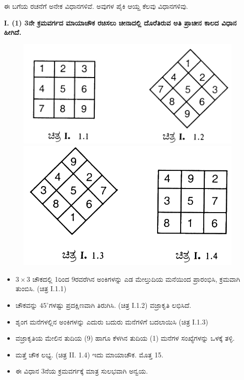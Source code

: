 ಈ ಬಗೆಯ ರಚನೆಗೆ ಅನೇಕ ವಿಧಾನಗಳಿವೆ. ಅವುಗಳ ಪೈಕಿ ಆಯ್ದ ಕೆಲವು ವಿಧಾನಗಳಿವು.

\noindent\textbf{I. (1) 3ನೇ ಕ್ರಮವರ್ಗದ ಮಾಯಾಚೌಕ ರಚಿಸಲು ಚೀನಾದಲ್ಲಿ ದೊರೆತಿರುವ ಅತಿ ಪ್ರಾಚೀನ ಕಾಲದ ವಿಧಾನ ಹೀಗಿದೆ.}

\begin{figure}[H]
\includegraphics{src/figures/chap3/fig3-1.jpg}\\
\includegraphics{src/figures/chap3/fig3-2.jpg}
\end{figure}

\begin{itemize}
	\item $3 \times 3$ ಚೌಕದಲ್ಲಿ 1ರಿಂದ 9ರವರೆಗಿನ ಅಂಕಿಗಳನ್ನು ಎಡ ಮೇಲ್ತುದಿಯ ಮನೆಯಿಂದ ಪ್ರಾರಂಭಿಸಿ, ಕ್ರಮವಾಗಿ ತುಂಬಿಸಿ. (ಚಿತ್ರ I.1.1)
	\item ಚೌಕವನ್ನು $45^\circ$ಗಳಷ್ಟು ಪ್ರದಕ್ಷಿಣವಾಗಿ ತಿರುಗಿಸಿ. (ಚಿತ್ರ I.1.2) ವಜ್ರಾಕೃತಿ \hbox{ಲಭಿಸಿದೆ.}
	\item ಶೃಂಗ ಮನೆಗಳಲ್ಲಿನ ಅಂಕಿಗಳನ್ನು ಎದುರು ಬದುರು ಮನೆಗಳಿಗೆ ಬದಲಾಯಿಸಿ (ಚಿತ್ರ I.1.3)
	\item ವಜ್ರಾಕೃತಿಯ ಮೇಲಿನ ತುದಿಯ (9) ಹಾಗೂ ಕೆಳಗಿನ ತುದಿಯ (1) ಮನೆಗಳ \break ಸಂಖ್ಯೆಗಳನ್ನು ಒಳಕ್ಕೆ ತಳ್ಳಿ.
	\item ಮತ್ತೆ ಚೌಕ ಲಭ್ಯ. (ಚಿತ್ರ II. 1.4) ಇದು ಮಾಯಾಚೌಕ. ಮೊತ್ತ 15.
	\item ಈ ವಿಧಾನ 3ನೆಯ ಕ್ರಮವರ್ಗಕ್ಕೆ ಮಾತ್ರ ಸುಲಭವಾಗಿ ಅನ್ವಯ.
\end{itemize}

